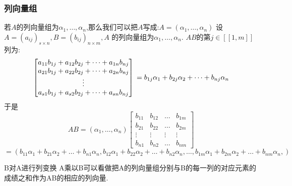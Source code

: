\documentclass{article}
\begin{document}
\subsubsection{列向量组}
若$A$的列向量组为$\alpha_1,\ldots,\alpha_n$,那么我们可以把$A$写成:$A=(\alpha_1,\ldots,\alpha_n)$ \newline
设$A=(a_{ij})_{s\times n},B=(b_{ij})_{n\times m},A$ 的列向量组为$\alpha_1,\ldots,\alpha_n$. \newline
$AB$的第$j\in [[1,m]]$列为: \newline
$$
\begin{bmatrix}
  a_{11}b_{1j}+a_{12}b_{2j}+\dots+a_{1n}b_{nj}  \\
  a_{21}b_{1j}+a_{22}b_{2j}+\dots+a_{2n}b_{nj}  \\
  \vdots \\
  a_{s1}b_{1j}+a_{s2}b_{2j}+\dots+a_{sn}b_{nj}
\end{bmatrix}
\\
=
b_{1j}\alpha_1+b_{2j}\alpha_2+\dots+b_{nj}\alpha_n
$$
于是
$$
AB=(\alpha_1,\ldots,\alpha_n)
\begin{bmatrix}
  b_{11} & b_{12} & \dots & b_{1m}  \\
  b_{21} & b_{22} & \dots & b_{2m}  \\
  \vdots & \vdots & \vdots &\vdots \\
  b_{n1} & b_{n2} & \dots & b_{nm}
\end{bmatrix}
$$
$=(b_{11}\alpha_1+b_{21}\alpha_2+\dots+b_{n1}\alpha_n,b_{12}\alpha_1+b_{22}\alpha_2+\dots+b_{n2}\alpha_n,\ldots,b_{1m}\alpha_1+b_{2m}\alpha_2+\dots+b_{nm}\alpha_n,)$
\begin{note}
  B对A进行列变换 \newline
  A乘以B可以看做把A的列向量组分别与B的每一列的对应元素的成绩之和作为AB的相应的列向量.
\end{note}
\end{document}
